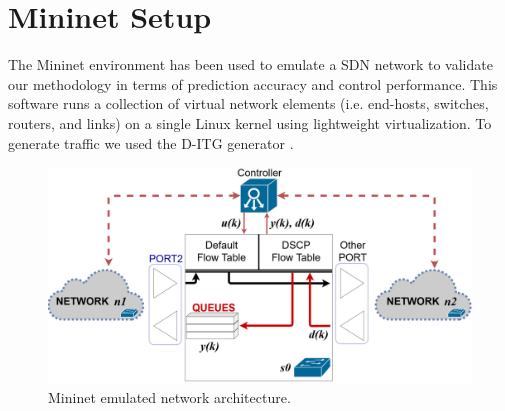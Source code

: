 \section{Mininet Setup} \label{sec:SDNNetSim}
The Mininet environment \cite{Mininet} has been used to emulate a SDN network to validate our methodology in terms of prediction accuracy and control performance. This software runs a collection of virtual network elements (i.e. end-hosts, switches, routers, and links) on a single Linux kernel using lightweight virtualization. 
To generate traffic we used the D-ITG generator \cite{Avallone2004, Botta2012, Botta2013}.

\begin{figure}[tb!]
	\centering
	\includegraphics[keepaspectratio,width=\columnwidth]{figure/SDN_net_EPS.eps}
	\caption{Mininet emulated network architecture.}
	\label{fig:{Network}}
\end{figure}

